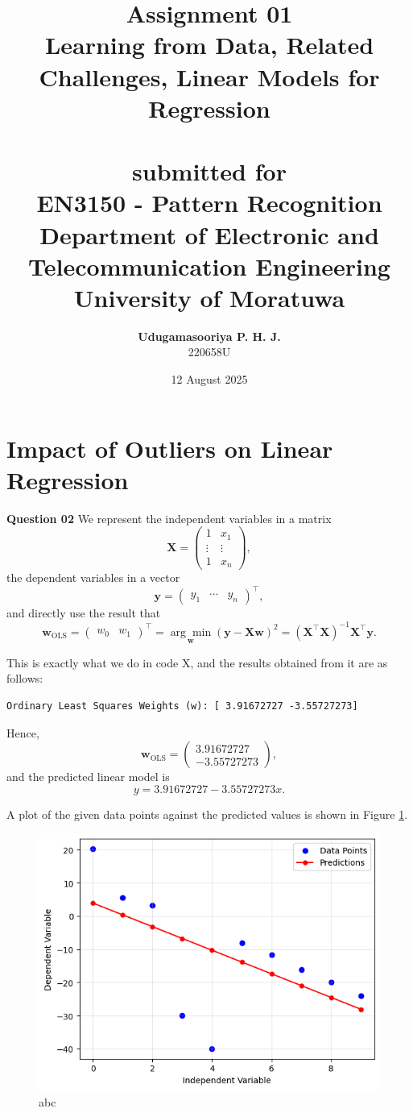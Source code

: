 \documentclass{article}[a4paper]
\title{
	\huge{\textbf{
		Assignment 01
	}}\\
	\Large{
		Learning from Data, Related Challenges, Linear Models for Regression
	}\\
	\large{\phantom{}}\\
	\large{
		submitted for
	}\\
	\LARGE{
		\textbf{EN3150 - Pattern Recognition}
	}\\
	\large{
		Department of Electronic and Telecommunication Engineering
	}
	\\
	\large{University of Moratuwa}
}
\author{
	\textbf{Udugamasooriya P. H. J.}\\
	220658U %
}
\date{12 August 2025}
\begin{document}
	\maketitle

	\section{Impact of Outliers on Linear Regression}

	\textbf{Question 02}
	We represent the independent variables in a matrix \[
		\mathbf{X} = \begin{pmatrix}
			1		& x_1		\\
			\vdots	& \vdots	\\
			1		& x_n
		\end{pmatrix},
	\] the dependent variables in a vector \[
		\mathbf{y} = \begin{pmatrix}
			y_1 & \cdots & y_n
		\end{pmatrix} ^ \top,
	\] and directly use the result that \[
		\mathbf{w}_\text{OLS}
		=
		\begin{pmatrix} w_0 & w_1 \end{pmatrix} ^ \top
		=
		\underset{\mathbf{w}}{\arg\min}
		\left( \mathbf{y} - \mathbf{X} \mathbf{w} \right)^2
		=
		\left( \mathbf{X}^\top \mathbf{X} \right)^{-1} \mathbf{X}^\top \mathbf{y}.
	\]
	
	This is exactly what we do in code X, and the results obtained from it are as follows:
	\begin{verbatim}
Ordinary Least Squares Weights (w): [ 3.91672727 -3.55727273]
	\end{verbatim}

	Hence, \[
		\mathbf{w}_\text{OLS} = \begin{pmatrix} 3.91672727 \\ -3.55727273 \end{pmatrix},
	\] and the predicted linear model is \[
		y = 3.91672727 - 3.55727273 x.
	\]

	A plot of the given data points against the predicted values is shown in Figure \ref{q1}.

	\begin{figure}[H]
		\centering
		\includegraphics[width=0.8\linewidth]{images/q1.png}
		\caption{abc}
		\label{q1}
	\end{figure}
\end{document}
